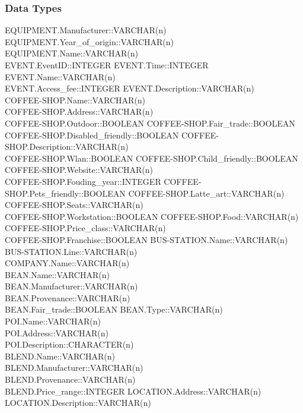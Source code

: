 \subsubsection{Data Types}
EQUIPMENT.Manufacturer::VARCHAR(n)\\
EQUIPMENT.Year\_of\_origin::VARCHAR(n)\\
EQUIPMENT.Name::VARCHAR(n)\\
EVENT.EventID::INTEGER
EVENT.Time::INTEGER
EVENT.Name::VARCHAR(n)\\
EVENT.Access\_fee::INTEGER
EVENT.Description::VARCHAR(n)\\
COFFEE-SHOP.Name::VARCHAR(n)\\
COFFEE-SHOP.Address::VARCHAR(n)\\
COFFEE-SHOP.Outdoor::BOOLEAN
COFFEE-SHOP.Fair\_trade::BOOLEAN
COFFEE-SHOP.Disabled\_friendly::BOOLEAN
COFFEE-SHOP.Description::VARCHAR(n)\\
COFFEE-SHOP.Wlan::BOOLEAN
COFFEE-SHOP.Child\_friendly::BOOLEAN
COFFEE-SHOP.Website::VARCHAR(n)\\
COFFEE-SHOP.Fouding\_year::INTEGER
COFFEE-SHOP.Pets\_friendly::BOOLEAN
COFFEE-SHOP.Latte\_art::VARCHAR(n)\\
COFFEE-SHOP.Seats::VARCHAR(n)\\
COFFEE-SHOP.Workstation::BOOLEAN
COFFEE-SHOP.Food::VARCHAR(n)\\
COFFEE-SHOP.Price\_class::VARCHAR(n)\\
COFFEE-SHOP.Franchise::BOOLEAN
BUS-STATION.Name::VARCHAR(n)\\
BUS-STATION.Line::VARCHAR(n)\\
COMPANY.Name::VARCHAR(n)\\
BEAN.Name::VARCHAR(n)\\
BEAN.Manufacturer::VARCHAR(n)\\
BEAN.Provenance::VARCHAR(n)\\
BEAN.Fair\_trade::BOOLEAN
BEAN.Type::VARCHAR(n)\\
POI.Name::VARCHAR(n)\\
POI.Address::VARCHAR(n)\\
POI.Description::CHARACTER(n)\\
BLEND.Name::VARCHAR(n)\\
BLEND.Manufacturer::VARCHAR(n)\\
BLEND.Provenance::VARCHAR(n)\\
BLEND.Price\_range::INTEGER
LOCATION.Address::VARCHAR(n)\\
LOCATION.Description::VARCHAR(n)\\
